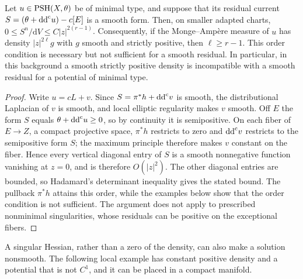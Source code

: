 \begin{proposition}\label{prop:exceptional-density-obstruction}
Let $u\in\mathrm{PSH}(X,\theta)$ be of minimal type, and suppose that its residual current $S=(\theta+\mathrm{dd}^{\mathrm{c}} u)-c[E]$ is a smooth form. Then, on smaller adapted charts, $0\leq S^n/\mathrm{d} V\leq C|z|^{2(r-1)}$. Consequently, if the Monge--Amp\`ere measure of $u$ has density $|z|^{2\ell}g$ with $g$ smooth and strictly positive, then $\ell\geq r-1$. This order condition is necessary but not sufficient for a smooth residual. In particular, in this background a smooth strictly positive density is incompatible with a smooth residual for a potential of minimal type.
\end{proposition}

\begin{proof}
Write $u=cL+v$. Since $S=\pi^*h+\mathrm{dd}^{\mathrm{c}} v$ is smooth, the distributional Laplacian of $v$ is smooth, and local elliptic regularity makes $v$ smooth. Off $E$ the form $S$ equals $\theta+\mathrm{dd}^{\mathrm{c}} u\geq0$, so by continuity it is semipositive. On each fiber of $E\to Z$, a compact projective space, $\pi^*h$ restricts to zero and $\mathrm{dd}^{\mathrm{c}} v$ restricts to the semipositive form $S$; the maximum principle therefore makes $v$ constant on the fiber. Hence every vertical diagonal entry of $S$ is a smooth nonnegative function vanishing at $z=0$, and is therefore $O(|z|^2)$. The other diagonal entries are bounded, so Hadamard's determinant inequality gives the stated bound. The pullback $\pi^*h$ attains this order, while the examples below show that the order condition is not sufficient. The argument does not apply to prescribed nonminimal singularities, whose residuals can be positive on the exceptional fibers.
\end{proof}

A singular Hessian, rather than a zero of the density, can also make a solution nonsmooth. The following local example has constant positive density and a potential that is not $C^1$, and it can be placed in a compact manifold.

